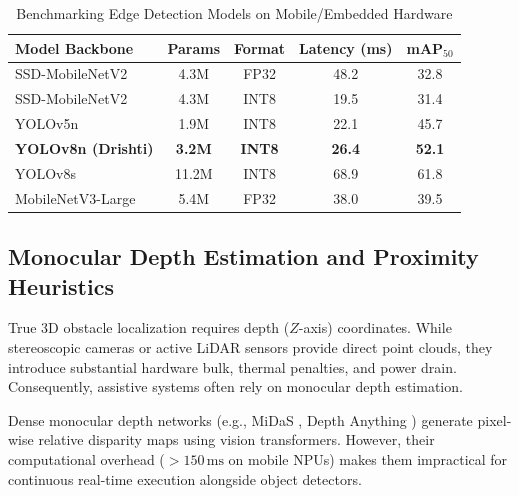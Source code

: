 \documentclass[10pt,twocolumn]{article}
\begin{document}
\begin{table}[b]
\centering
\small
\caption{Benchmarking Edge Detection Models on Mobile/Embedded Hardware}
\label{tab:edge_models}
\begin{tabularx}{\columnwidth}{l c c c c}
\toprule
\textbf{Model Backbone} & \textbf{Params} & \textbf{Format} & \textbf{Latency (ms)} & \textbf{mAP}$_{50}$ \\
\midrule
SSD-MobileNetV2 & 4.3M & FP32 & 48.2 & 32.8 \\
SSD-MobileNetV2 & 4.3M & INT8 & 19.5 & 31.4 \\
YOLOv5n & 1.9M & INT8 & 22.1 & 45.7 \\
\textbf{YOLOv8n (Drishti)} & \textbf{3.2M} & \textbf{INT8} & \textbf{26.4} & \textbf{52.1} \\
YOLOv8s & 11.2M & INT8 & 68.9 & 61.8 \\
MobileNetV3-Large & 5.4M & FP32 & 38.0 & 39.5 \\
\bottomrule
\end{tabularx}
\end{table}

\subsection{Monocular Depth Estimation and Proximity Heuristics}
True 3D obstacle localization requires depth ($Z$-axis) coordinates. While stereoscopic cameras or active LiDAR sensors provide direct point clouds, they introduce substantial hardware bulk, thermal penalties, and power drain. Consequently, assistive systems often rely on monocular depth estimation.

Dense monocular depth networks (e.g., MiDaS \cite{ranftl2020towards}, Depth Anything \cite{yang2024depth}) generate pixel-wise relative disparity maps using vision transformers. However, their computational overhead ($>150\,\text{ms}$ on mobile NPUs) makes them impractical for continuous real-time execution alongside object detectors.
\end{document}
